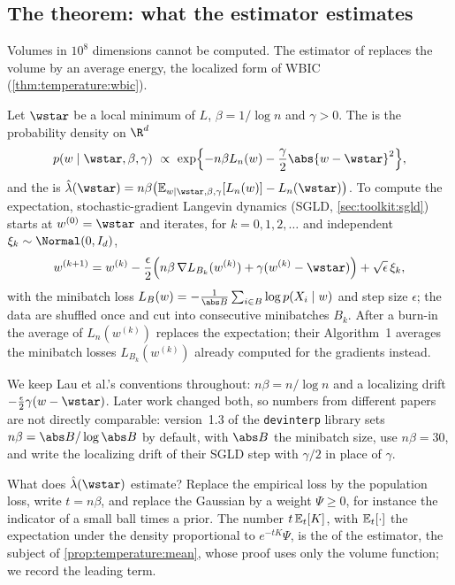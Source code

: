 \begin{refsection}
\section{The theorem: what the estimator estimates}\label{sec:llc:estimator}

Volumes in $10^8$ dimensions cannot be computed. The estimator of \textcite{LauEtAl2025} replaces the volume by an average energy, the localized form of WBIC (\cref{thm:temperature:wbic}).

\begin{definition}\label{def:llc:estimator}
Let $\wstar$ be a local minimum of $L$, $\beta=1/\log n$ and $\gamma>0$. The  is the probability density on $\R^d$
\[
p(w\mid\wstar,\beta,\gamma)\ \propto\ \exp\Bigl\{-n\beta L_n(w)-\frac\gamma2\abs{w-\wstar}^2\Bigr\},
\]
and the  is $\hat\lambda(\wstar)=n\beta\bigl(\llcpost{L_n(w)}-L_n(\wstar)\bigr)$. To compute the expectation, stochastic-gradient Langevin dynamics (SGLD, \cref{sec:toolkit:sgld}) starts at $w^{(0)}=\wstar$ and iterates, for $k=0,1,2,\dots$ and independent $\xi_k\sim\Normal(0,I_d)$,
\[
w^{(k+1)}=w^{(k)}-\frac\epsilon2\Bigl(n\beta\,\nabla L_{B_k}(w^{(k)})+\gamma(w^{(k)}-\wstar)\Bigr)+\sqrt\epsilon\,\xi_k,
\]
with the minibatch loss $L_{B}(w)=-\frac1{\abs B}\sum_{i\in B}\log p(X_i\mid w)$ and step size $\epsilon$; the data are shuffled once and cut into consecutive minibatches $B_k$. After a burn-in the average of $L_n(w^{(k)})$ replaces the expectation; their Algorithm~1 averages the minibatch losses $L_{B_k}(w^{(k)})$ already computed for the gradients instead.
\end{definition}

We keep Lau et al.'s conventions throughout: $n\beta=n/\log n$ and a localizing drift $-\tfrac\epsilon2\gamma(w-\wstar)$. Later work changed both, so numbers from different papers are not directly comparable: version~1.3 of the \texttt{devinterp} library \parencite{vanWingerdenEtAl2024} sets $n\beta=\abs B/\log\abs B$ by default, with $\abs B$ the minibatch size, \textcite{WangEtAl2025a} use $n\beta=30$, and \textcite{HooglandEtAl2025} write the localizing drift of their SGLD step with $\gamma/2$ in place of $\gamma$.

What does $\hat\lambda(\wstar)$ estimate? Replace the empirical loss by the population loss, write $t=n\beta$, and replace the Gaussian by a weight $\Psi\ge0$, for instance the indicator of a small ball times a prior. The number $t\,\mathbb{E}_{t}\!\left[K\right]$, with $\mathbb{E}_{t}\!\left[\cdot\right]$ the expectation under the density proportional to $e^{-tK}\Psi$, is the  of the estimator, the subject of \cref{prop:temperature:mean}, whose proof uses only the volume function; we record the leading term.


\end{refsection}
